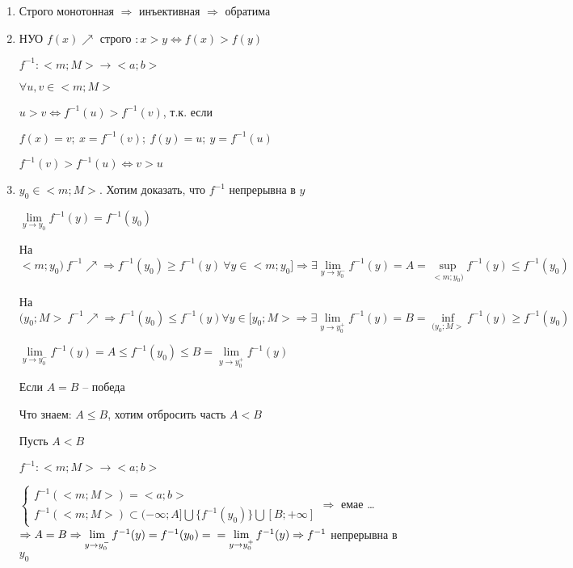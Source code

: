 \documentclass[14pt, letter paper]{article}
\begin{document}
\begin{enumerate}
    \item Строго монотонная $\Rightarrow$ инъективная $\Rightarrow$ обратима

    \item НУО $f(x) \nearrow$ строго $: x > y \Leftrightarrow f(x) > f(y)$

    $f^{-1} : <m;M> \rightarrow <a;b>$

    $\forall u, v \in <m;M>$

    $u > v \Leftrightarrow f^{-1}(u) > f^{-1}(v)$, т.к. если

    $f(x) = v;\ x = f^{-1}(v);\ f(y) = u;\ y = f^{-1}(u)$

    $f^{-1}(v) > f^{-1}(u) \Leftrightarrow v > u$

    \item $y_0 \in <m;M>$. Хотим доказать, что $f^{-1}$ непрерывна в $y$

    $\lim\limits_{y \rightarrow y_0}{f^{-1}(y)} = f^{-1}(y_0)$

    На $<m;y_0)\ f^{-1} \nearrow \Rightarrow f^{-1}(y_0) \geq f^{-1}(y)\ \forall y \in <m; y_0] \Rightarrow \exists \lim\limits_{y \rightarrow y_0^-}{f^{-1}(y)} = A = \sup\limits_{<m;y_0)}f^{-1}(y) \leq f^{-1}(y_0)$

    На $(y_0;M>\ f^{-1} \nearrow \Rightarrow f^{-1}(y_0) \leq f^{-1}(y) \forall y \in [y_0;M> \Rightarrow \exists \lim\limits_{y \rightarrow y_0^+}{f^{-1}(y)} = B = \inf\limits_{(y_0;M>}{f^{-1}(y)} \geq f^{-1}(y_0)$

    $\lim\limits_{y \rightarrow y_0^-}{f^{-1}(y)} = A \leq f^{-1}(y_0) \leq B = \lim\limits_{y \rightarrow y_0^+}{f^{-1}(y)}$

    Если $A = B$ -- победа

    Что знаем: $A \leq B$, хотим отбросить часть $A < B$

    Пусть $A < B$

    $f^{-1} : <m;M> \rightarrow <a;b>$

    $\begin{cases}
        f^{-1}(<m;M>) = <a;b> \\
        f^{-1}(<m;M>) \subset (- \infty; A] \bigcup \{f^{-1}(y_0)\} \bigcup [B; + \infty]
    \end{cases} \Rightarrow$ емае \ldots $\Rightarrow A = B \Rightarrow \lim\limits_{y \rightarrow y_0^-}{f^{-1}(y)} = f^{-1}(y_0) = \\ = \lim\limits_{y \rightarrow y_0^+}{f^{-1}(y)} \Rightarrow f^{-1}$ непрерывна в $y_0$
\end{enumerate}
\end{document}
